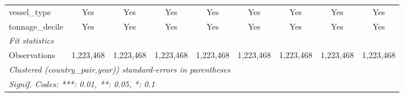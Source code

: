 \begin{tabular}{lcccccccc}
   vessel\_type                          & Yes             & Yes             & Yes             & Yes            & Yes             & Yes             & Yes            & Yes\\  
   tonnage\_decile                       & Yes             & Yes             & Yes             & Yes            & Yes             & Yes             & Yes            & Yes\\  
   \midrule
   \emph{Fit statistics}\\
   Observations                          & 1,223,468       & 1,223,468       & 1,223,468       & 1,223,468      & 1,223,468       & 1,223,468       & 1,223,468      & 1,223,468\\  
   \midrule \midrule
   \multicolumn{9}{l}{\emph{Clustered (country\_pair,year)) standard-errors in parentheses}}\\
   \multicolumn{9}{l}{\emph{Signif. Codes: ***: 0.01, **: 0.05, *: 0.1}}\\
\end{tabular}
\par\endgroup


